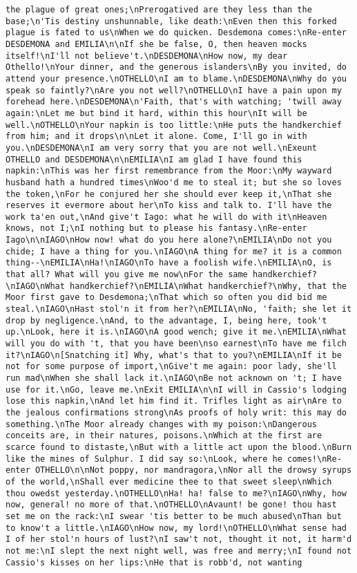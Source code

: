 \begin{verbatim}
the plague of great ones;\nPrerogatived are they less than the base;\n'Tis destiny unshunnable, like death:\nEven then this forked plague is fated to us\nWhen we do quicken. Desdemona comes:\nRe-enter DESDEMONA and EMILIA\n\nIf she be false, O, then heaven mocks itself!\nI'll not believe't.\nDESDEMONA\nHow now, my dear Othello!\nYour dinner, and the generous islanders\nBy you invited, do attend your presence.\nOTHELLO\nI am to blame.\nDESDEMONA\nWhy do you speak so faintly?\nAre you not well?\nOTHELLO\nI have a pain upon my forehead here.\nDESDEMONA\n'Faith, that's with watching; 'twill away again:\nLet me but bind it hard, within this hour\nIt will be well.\nOTHELLO\nYour napkin is too little:\nHe puts the handkerchief from him; and it drops\n\nLet it alone. Come, I'll go in with you.\nDESDEMONA\nI am very sorry that you are not well.\nExeunt OTHELLO and DESDEMONA\n\nEMILIA\nI am glad I have found this napkin:\nThis was her first remembrance from the Moor:\nMy wayward husband hath a hundred times\nWoo'd me to steal it; but she so loves the token,\nFor he conjured her she should ever keep it,\nThat she reserves it evermore about her\nTo kiss and talk to. I'll have the work ta'en out,\nAnd give't Iago: what he will do with it\nHeaven knows, not I;\nI nothing but to please his fantasy.\nRe-enter Iago\n\nIAGO\nHow now! what do you here alone?\nEMILIA\nDo not you chide; I have a thing for you.\nIAGO\nA thing for me? it is a common thing--\nEMILIA\nHa!\nIAGO\nTo have a foolish wife.\nEMILIA\nO, is that all? What will you give me now\nFor the same handkerchief?\nIAGO\nWhat handkerchief?\nEMILIA\nWhat handkerchief?\nWhy, that the Moor first gave to Desdemona;\nThat which so often you did bid me steal.\nIAGO\nHast stol'n it from her?\nEMILIA\nNo, 'faith; she let it drop by negligence.\nAnd, to the advantage, I, being here, took't up.\nLook, here it is.\nIAGO\nA good wench; give it me.\nEMILIA\nWhat will you do with 't, that you have been\nso earnest\nTo have me filch it?\nIAGO\n[Snatching it] Why, what's that to you?\nEMILIA\nIf it be not for some purpose of import,\nGive't me again: poor lady, she'll run mad\nWhen she shall lack it.\nIAGO\nBe not acknown on 't; I have use for it.\nGo, leave me.\nExit EMILIA\n\nI will in Cassio's lodging lose this napkin,\nAnd let him find it. Trifles light as air\nAre to the jealous confirmations strong\nAs proofs of holy writ: this may do something.\nThe Moor already changes with my poison:\nDangerous conceits are, in their natures, poisons.\nWhich at the first are scarce found to distaste,\nBut with a little act upon the blood.\nBurn like the mines of Sulphur. I did say so:\nLook, where he comes!\nRe-enter OTHELLO\n\nNot poppy, nor mandragora,\nNor all the drowsy syrups of the world,\nShall ever medicine thee to that sweet sleep\nWhich thou owedst yesterday.\nOTHELLO\nHa! ha! false to me?\nIAGO\nWhy, how now, general! no more of that.\nOTHELLO\nAvaunt! be gone! thou hast set me on the rack:\nI swear 'tis better to be much abused\nThan but to know't a little.\nIAGO\nHow now, my lord!\nOTHELLO\nWhat sense had I of her stol'n hours of lust?\nI saw't not, thought it not, it harm'd not me:\nI slept the next night well, was free and merry;\nI found not Cassio's kisses on her lips:\nHe that is robb'd, not wanting 
\end{verbatim}
